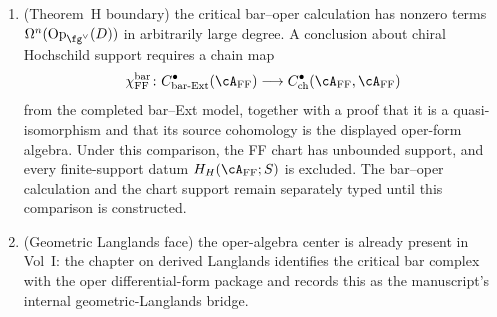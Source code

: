 \begin{theorem}
\begin{enumerate}[label=\textup{(\roman*)},leftmargin=*]
 the ordinary center is the Feigin--Frenkel center
 \[
 Z(\cA_{\mathrm{FF}})
 \cong \operatorname{Fun}\!\bigl(\mathrm{Op}_{\fg^\vee}(D)\bigr)
 \]
 \textup{(}Feigin--Frenkel~\cite{Feigin-Frenkel}, Frenkel~\cite{Fre07},
 Beilinson--Drinfeld~\cite{BD04}\textup{)}.
 The critical bar complex computes the oper de~Rham package:
 \[
 H^n\!\bigl(\bar{B}^{\mathrm{ch}}(\cA_{\mathrm{FF}})\bigr)
 \cong \Omega^n\!\bigl(\mathrm{Op}_{\fg^\vee}(D)\bigr)
 \qquad (n \ge 0),
 \]
 while the derived centre remains
 $C^\bullet_{\mathrm{ch}}(\cA_{\mathrm{FF}},\cA_{\mathrm{FF}})$.
 The critical bar complex supplies resolution input for the vacuum
 Ext calculation
 \textup{(}Theorem~\textup{\ref{thm:langlands-bar-bridge}(iii)}\textup{)}.
\item \textup{(}Theorem~H boundary\textup{)}
 the critical bar--oper calculation has nonzero terms
 $\Omega^n(\mathrm{Op}_{\fg^\vee}(D))$ in arbitrarily large degree.
 A conclusion about chiral Hochschild support requires a chain map
 \[
  \chi_{\mathrm{FF}}^{\mathrm{bar}}
  \colon C^\bullet_{\mathrm{bar\text{-}Ext}}(\cA_{\mathrm{FF}})
  \longrightarrow
  C^\bullet_{\mathrm{ch}}(\cA_{\mathrm{FF}},\cA_{\mathrm{FF}})
 \]
 from the completed bar--Ext model, together with a proof that it is a
 quasi-isomorphism and that its source cohomology is the displayed
 oper-form algebra. Under this comparison, the FF chart has unbounded
 support, and every finite-support datum $H_H(\cA_{\mathrm{FF}};S)$ is
 excluded. The bar--oper calculation and the chart support remain
 separately typed until this comparison is constructed.
\item \textup{(}Geometric Langlands face\textup{)}
 the oper-algebra center is already present in Vol~I: the chapter on
 derived Langlands identifies the critical bar complex with the oper
 differential-form package and records this as the manuscript's
 internal geometric-Langlands bridge.
\end{enumerate}
\end{theorem}

